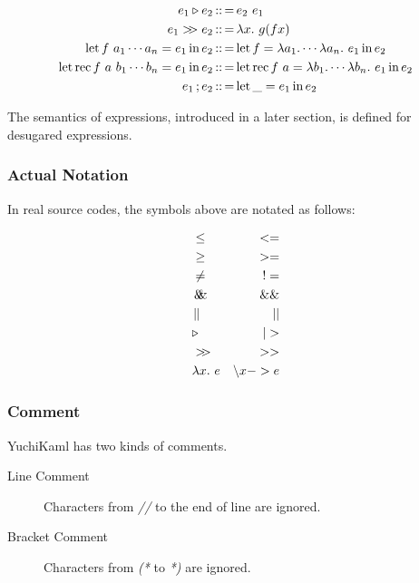 \begin{align*}
        e_1 \triangleright e_2 &\defeq e_2\ e_1 \\
        e_1 \composition e_2 &\defeq \abs{x}{g (f x)}\\
        \letStructure{f\ a_{1} \cdots a_n}{e_1}{e_2}&\defeq
            \letStructure{f}{\lambda a_1 . \cdots \lambda a_n.\ {e_1}}{e_2}\\
        \letRecStructure{f}{a\ b_{1} \cdots b_n}{e_1}{e_2}&\defeq
            \letRecStructure{f}{a}{\lambda b_1 . \cdots \lambda b_n.\ {e_1}}{e_2}\\
        e_1\opCol{}e_2 &\defeq \letStructure{\_}{e_1}{e_2}
\end{align*}

The semantics of expressions, introduced in a later section, is defined for desugared expressions.

\subsubsection{Actual Notation}

In real source codes, the symbols above are notated as follows:

\begin{align*}
    &\leq & <=\\
    &\geq & >=\\
    &\not= & !=\\
    &\logAnd & \&\&\\
    &\logOr & ||\\
    &\triangleright & |>\\
    &\composition & >>\\
    &\abs{x}{e} & \backslash x -> e
\end{align*}

\subsubsection{Comment}

YuchiKaml has two kinds of comments.

\begin{description}
    \item[Line Comment]
        Characters from \emph{//} to the end of line are ignored.
    \item[Bracket Comment]
        Characters from \emph{(*} to \emph{*)} are ignored.
\end{description}
